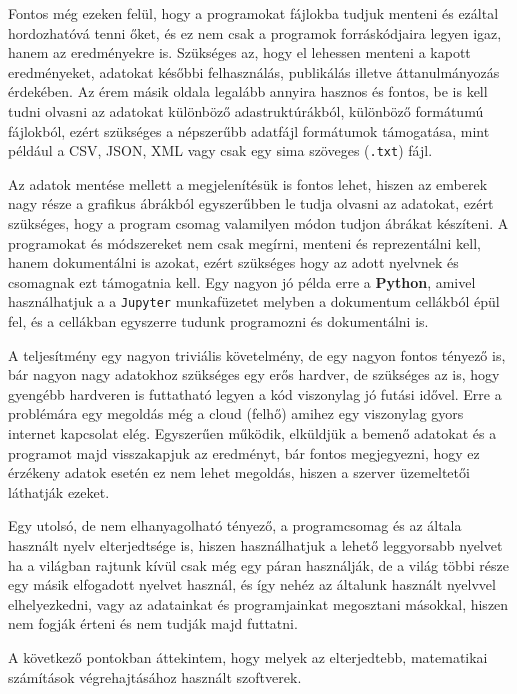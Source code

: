 Fontos még ezeken felül, hogy a programokat fájlokba tudjuk menteni és
ezáltal hordozhatóvá tenni őket, és ez nem csak a programok
forráskódjaira legyen igaz, hanem az eredményekre is. Szükséges az, hogy
el lehessen menteni a kapott eredményeket, adatokat későbbi
felhasználás, publikálás illetve áttanulmányozás érdekében. Az érem
másik oldala legalább annyira hasznos és fontos, be is kell tudni
olvasni az adatokat különböző adastruktúrákból, különböző formátumú
fájlokból, ezért szükséges a népszerűbb adatfájl formátumok támogatása,
mint például a CSV, JSON, XML vagy csak egy sima szöveges (\texttt{.txt}) fájl.

Az adatok mentése mellett a megjelenítésük is fontos lehet, hiszen az
emberek nagy része a grafikus ábrákból egyszerűbben le tudja olvasni az
adatokat, ezért szükséges, hogy a program csomag valamilyen módon tudjon
ábrákat készíteni. A programokat és módszereket nem csak megírni,
menteni és reprezentálni kell, hanem dokumentálni is azokat, ezért
szükséges hogy az adott nyelvnek és csomagnak ezt támogatnia kell. Egy
nagyon jó példa erre a \textbf{Python}, amivel használhatjuk a a
\texttt{Jupyter} munkafüzetet melyben a dokumentum cellákból épül fel, és
a cellákban egyszerre tudunk programozni és dokumentálni is.

A teljesítmény egy nagyon triviális követelmény, de egy nagyon fontos
tényező is, bár nagyon nagy adatokhoz szükséges egy erős hardver, de
szükséges az is, hogy gyengébb hardveren is futtatható legyen a kód
viszonylag jó futási idővel. Erre a problémára egy megoldás még a cloud
(felhő) amihez egy viszonylag gyors internet kapcsolat elég. Egyszerűen
működik, elküldjük a bemenő adatokat és a programot majd visszakapjuk az
eredményt, bár fontos megjegyezni, hogy ez érzékeny adatok esetén ez nem
lehet megoldás, hiszen a szerver üzemeltetői láthatják ezeket.

Egy utolsó, de nem elhanyagolható tényező, a programcsomag és az általa
használt nyelv elterjedtsége is, hiszen használhatjuk a lehető
leggyorsabb nyelvet ha a világban rajtunk kívül csak még egy páran
használják, de a világ többi része egy másik elfogadott nyelvet használ,
és így nehéz az általunk használt nyelvvel elhelyezkedni, vagy az
adatainkat és programjainkat megosztani másokkal, hiszen nem fogják
érteni és nem tudják majd futtatni.


A következő pontokban áttekintem, hogy melyek az elterjedtebb, matematikai számítások végrehajtásához használt szoftverek.

